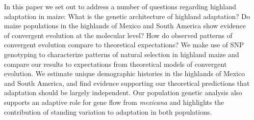 In this paper we set out to address a number of questions regarding highland adaptation in maize: 
What is the genetic architecture of highland adaptation? 
Do maize populations in the highlands of Mexico and South America show evidence of convergent evolution at the molecular level? 
How do observed patterns of convergent evolution compare to theoretical expectations?
We make use of SNP genotyping to characterize patterns of natural selection in highland maize and compare our results to expectations from theoretical models of convergent evolution.  
We estimate unique demographic histories in the highlands of Mexico and South America, and find evidence supporting our theoretical predictions that adaptation should be largely independent. 
Our population genetic analysis also supports an adaptive role for gene flow from \emph{mexicana} and highlights the contribution of standing variation to adaptation in both populations.
